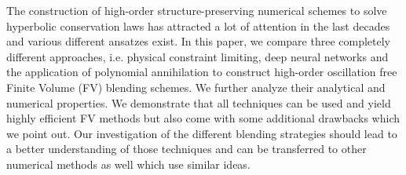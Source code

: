 The construction of high-order structure-preserving numerical schemes to solve hyperbolic conservation laws has attracted a lot of attention in the last decades and various different ansatzes exist. 
In this paper, we compare  three completely different approaches, i.e. physical constraint limiting, deep neural networks and the application of polynomial annihilation to 
construct high-order oscillation free Finite Volume (FV) blending schemes. We further analyze their analytical and numerical properties. 
We demonstrate that all techniques can be used and yield highly efficient FV methods but also come with some additional drawbacks which we point out. 
Our investigation of the different blending strategies should lead to a better understanding of those techniques and can be transferred
 to other numerical methods as well which use similar ideas. 

